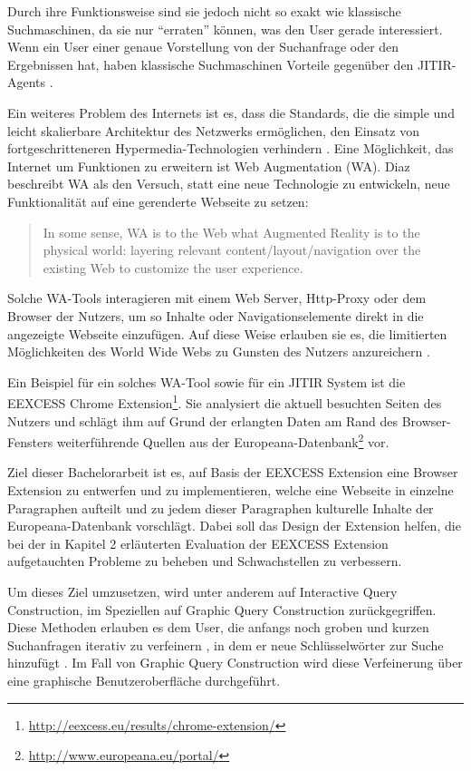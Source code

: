 Durch ihre Funktionsweise sind sie jedoch nicht so exakt wie klassische Suchmaschinen, da sie nur ``erraten'' können, was den User gerade interessiert. Wenn ein User einer genaue Vorstellung von der Suchanfrage oder den Ergebnissen hat, haben klassische Suchmaschinen Vorteile gegenüber den JITIR-Agents \cite{rhodes2000just}.

Ein weiteres Problem des Internets ist es, dass die Standards, die die simple und leicht skalierbare Architektur des Netzwerks ermöglichen, den Einsatz von fortgeschritteneren Hypermedia-Technologien verhindern \cite{bouvin1999unifying}. Eine Möglichkeit, das Internet um Funktionen zu erweitern ist Web Augmentation (WA). Diaz \cite{diaz2012understanding} beschreibt WA als den Versuch, statt eine neue Technologie zu entwickeln, neue Funktionalität auf eine gerenderte Webseite zu setzen:
\begin{quote}
In some sense, WA is to the Web what Augmented Reality is to the physical world: layering relevant content/layout/navigation over the existing Web to customize the user experience. \cite{diaz2012understanding}
\end{quote}
Solche WA-Tools interagieren mit einem Web Server, Http-Proxy oder dem Browser der Nutzers, um so Inhalte oder Navigationselemente direkt in die angezeigte Webseite einzufügen. Auf diese Weise erlauben sie es, die limitierten Möglichkeiten des World Wide Webs zu Gunsten des Nutzers anzureichern \cite{anderson1997integrating}.

Ein Beispiel für ein solches WA-Tool sowie für ein JITIR System ist die EEXCESS Chrome Extension\footnote{\url{http://eexcess.eu/results/chrome-extension/}}. Sie analysiert die aktuell besuchten Seiten des Nutzers und schlägt ihm auf Grund der erlangten Daten am Rand des Browser-Fensters weiterführende Quellen aus der Europeana-Datenbank\footnote{\url{http://www.europeana.eu/portal/}} vor.

Ziel dieser Bachelorarbeit ist es, auf Basis der EEXCESS Extension eine Browser Extension zu entwerfen und zu implementieren, welche eine Webseite in einzelne Paragraphen aufteilt und zu jedem dieser Paragraphen kulturelle Inhalte der Europeana-Datenbank vorschlägt. Dabei soll das Design der Extension helfen, die bei der in Kapitel 2 erläuterten Evaluation der EEXCESS Extension aufgetauchten Probleme zu beheben und Schwachstellen zu verbessern.

Um dieses Ziel umzusetzen, wird unter anderem auf Interactive Query Construction, im Speziellen auf Graphic Query Construction zurückgegriffen. Diese Methoden erlauben es dem User, die anfangs noch groben und kurzen Suchanfragen iterativ zu verfeinern \cite{goldman1999interactive}, in dem er neue Schlüsselwörter zur Suche hinzufügt \cite{ruthven2003re}. Im Fall von Graphic Query Construction wird diese Verfeinerung über eine graphische Benutzeroberfläche durchgeführt.

